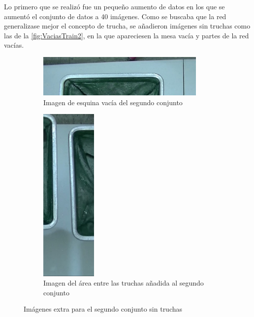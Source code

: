 Lo primero que se realizó fue un pequeño aumento de datos en los que se aumentó el conjunto de datos a 40 imágenes. Como se buscaba que la red generalizase mejor el concepto de trucha, se añadieron imágenes sin truchas como las de 
la \autoref{fig:VaciasTrain2}, en la que apareciesen la mesa vacía y partes de la red vacías.

\begin{figure}[H]
    \centering
    \begin{subfigure}[t]{0.55\textwidth}
        \centering
        \includegraphics[width=0.9\textwidth]{images/6/6.3/esquinaTopVacia.jpg}
        \caption{Imagen de esquina vacía del segundo conjunto}
    \end{subfigure}
    \begin{subfigure}[t]{0.4\textwidth}
        \centering
        \includegraphics[width=0.3\textwidth]{images/6/6.3/medioVacio.jpg}
        \caption{Imagen del área entre las truchas añadida al segundo conjunto}
    \end{subfigure}
    \caption{Imágenes extra para el segundo conjunto sin truchas}
    \label{fig:VaciasTrain2}
\end{figure}

